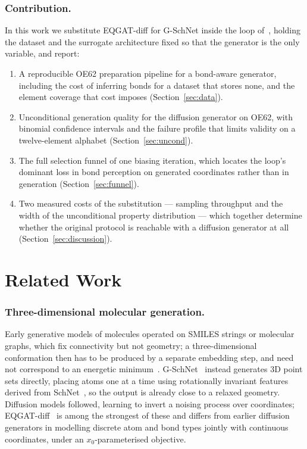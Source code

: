 \documentclass[runningheads]{llncs}
\begin{document}
\subsubsection{Contribution.} In this work we substitute EQGAT-diff for
G-SchNet inside the loop of~\cite{westermayr2022}, holding the dataset
and the surrogate architecture fixed so that the generator is the only
variable, and report:

\begin{enumerate}
  \item A reproducible OE62 preparation pipeline for a bond-aware
        generator, including the cost of inferring bonds for a dataset
        that stores none, and the element coverage that cost imposes
        (Section~\ref{sec:data}).
  \item Unconditional generation quality for the diffusion generator on
        OE62, with binomial confidence intervals and the failure profile
        that limits validity on a twelve-element alphabet
        (Section~\ref{sec:uncond}).
  \item The full selection funnel of one biasing iteration, which
        locates the loop's dominant loss in bond perception on generated
        coordinates rather than in generation (Section~\ref{sec:funnel}).
  \item Two measured costs of the substitution --- sampling throughput
        and the width of the unconditional property distribution ---
        which together determine whether the original protocol is
        reachable with a diffusion generator at all
        (Section~\ref{sec:discussion}).
\end{enumerate}

\section{Related Work}

\subsubsection{Three-dimensional molecular generation.}
Early generative models of molecules operated on SMILES strings or
molecular graphs, which fix connectivity but not geometry; a
three-dimensional conformation then has to be produced by a separate
embedding step, and need not correspond to an energetic
minimum~\cite{westermayr2022}. G-SchNet~\cite{gebauer2019} instead
generates 3D point sets directly, placing atoms one at a time using
rotationally invariant features derived from SchNet~\cite{schutt2018},
so the output is already close to a relaxed geometry. Diffusion models
followed, learning to invert a noising process over coordinates;
EQGAT-diff~\cite{le2023} is among the strongest of these and differs
from earlier diffusion generators in modelling discrete atom and bond
types jointly with continuous coordinates, under an $x_0$-parameterised
objective.
\end{document}
